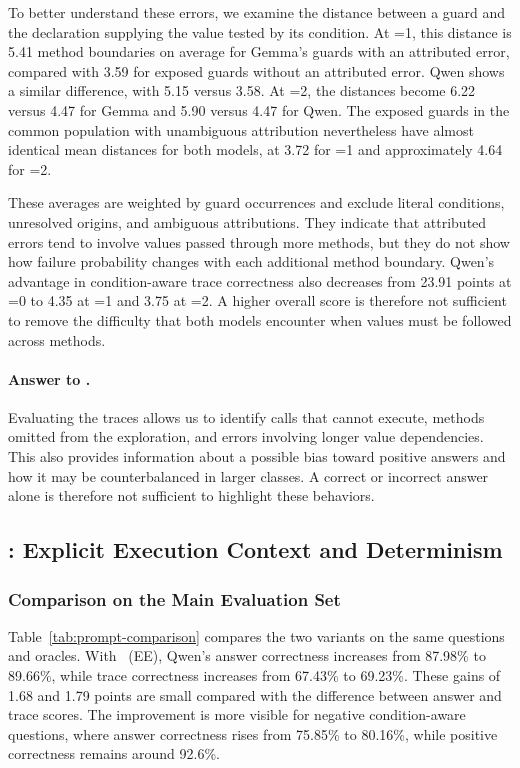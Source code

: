 To better understand these errors, we examine the distance between a guard and the declaration supplying the value tested by its condition. At =1, this distance is 5.41 method boundaries on average for Gemma's guards with an attributed error, compared with 3.59 for exposed guards without an attributed error. Qwen shows a similar difference, with 5.15 versus 3.58. At =2, the distances become 6.22 versus 4.47 for Gemma and 5.90 versus 4.47 for Qwen. The exposed guards in the common population with unambiguous attribution nevertheless have almost identical mean distances for both models, at 3.72 for =1 and approximately 4.64 for =2.

These averages are weighted by guard occurrences and exclude literal conditions, unresolved origins, and ambiguous attributions. They indicate that attributed errors tend to involve values passed through more methods, but they do not show how failure probability changes with each additional method boundary. Qwen's advantage in condition-aware trace correctness also decreases from 23.91 points at =0 to 4.35 at =1 and 3.75 at =2. A higher overall score is therefore not sufficient to remove the difficulty that both models encounter when values must be followed across methods.

\paragraph{Answer to .}
Evaluating the traces allows us to identify calls that cannot execute, methods omitted from the exploration, and errors involving longer value dependencies. This also provides information about a possible bias toward positive answers and how it may be counterbalanced in larger classes. A correct or incorrect answer alone is therefore not sufficient to highlight these behaviors.

\subsection{: Explicit Execution Context and Determinism}

\subsubsection{Comparison on the Main Evaluation Set}

Table~\ref{tab:prompt-comparison} compares the two variants on the same questions and oracles. With \benchmark~(EE), Qwen's answer correctness increases from 87.98\% to 89.66\%, while trace correctness increases from 67.43\% to 69.23\%. These gains of 1.68 and 1.79 points are small compared with the difference between answer and trace scores. The improvement is more visible for negative condition-aware questions, where answer correctness rises from 75.85\% to 80.16\%, while positive correctness remains around 92.6\%.

